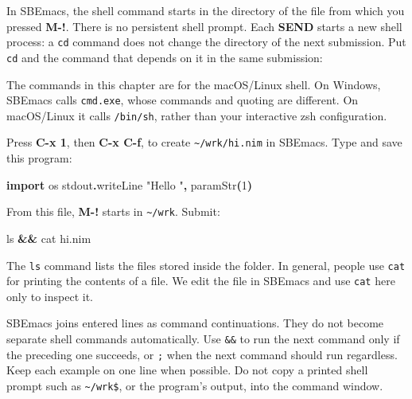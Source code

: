 \documentclass[
  12pt,
]{book}
\newenvironment{Shaded}{}{}
\newcommand{\AttributeTok}[1]{\textcolor[rgb]{0.49,0.56,0.16}{#1}}
\newcommand{\BuiltInTok}[1]{\textcolor[rgb]{0.00,0.50,0.00}{#1}}
\newcommand{\DataTypeTok}[1]{\textcolor[rgb]{0.56,0.13,0.00}{#1}}
\newcommand{\DecValTok}[1]{\textcolor[rgb]{0.25,0.63,0.44}{#1}}
\newcommand{\FunctionTok}[1]{\textcolor[rgb]{0.02,0.16,0.49}{#1}}
\newcommand{\KeywordTok}[1]{\textcolor[rgb]{0.00,0.44,0.13}{\textbf{#1}}}
\newcommand{\NormalTok}[1]{#1}
\newcommand{\StringTok}[1]{\textcolor[rgb]{0.25,0.44,0.63}{#1}}
\newcommand{\VariableTok}[1]{\textcolor[rgb]{0.10,0.09,0.49}{#1}}
\begin{document}
In SBEmacs, the shell command starts in the directory of the file from
which you pressed \textbf{M-!}. There is no persistent shell prompt.
Each \textbf{SEND} starts a new shell process: a \texttt{cd} command
does not change the directory of the next submission. Put \texttt{cd}
and the command that depends on it in the same submission:

\begin{Shaded}
\end{Shaded}

The commands in this chapter are for the macOS/Linux shell. On Windows,
SBEmacs calls \texttt{cmd.exe}, whose commands and quoting are
different. On macOS/Linux it calls \texttt{/bin/sh}, rather than your
interactive zsh configuration.

Press \textbf{C-x 1}, then \textbf{C-x C-f}, to create
\texttt{\textasciitilde{}/wrk/hi.nim} in SBEmacs. Type and save this
program:

\begin{Shaded}
\begin{Highlighting}[]
\KeywordTok{import}\NormalTok{ os}
\NormalTok{stdout}\KeywordTok{.}\DataTypeTok{writeLine} \StringTok{"Hello "}\KeywordTok{,} \DataTypeTok{paramStr}\KeywordTok{(}\DecValTok{1}\KeywordTok{)}
\end{Highlighting}
\end{Shaded}

From this file, \textbf{M-!} starts in \texttt{\textasciitilde{}/wrk}.
Submit:

\begin{Shaded}
\begin{Highlighting}[]
\FunctionTok{ls} \KeywordTok{\&\&} \FunctionTok{cat}\NormalTok{ hi.nim}
\end{Highlighting}
\end{Shaded}

The \texttt{ls} command lists the files stored inside the folder. In
general, people use \texttt{cat} for printing the contents of a file. We
edit the file in SBEmacs and use \texttt{cat} here only to inspect it.

SBEmacs joins entered lines as command continuations. They do not become
separate shell commands automatically. Use \texttt{\&\&} to run the next
command only if the preceding one succeeds, or \texttt{;} when the next
command should run regardless. Keep each example on one line when
possible. Do not copy a printed shell prompt such as
\texttt{\textasciitilde{}/wrk\$}, or the program's output, into the
command window.
\end{document}
